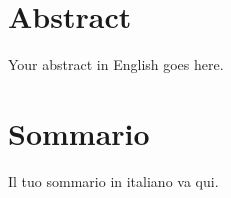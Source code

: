 \section*{Abstract}
Your abstract in English goes here.

\section*{Sommario}
\begin{otherlanguage}{italian}
Il tuo sommario in italiano va qui.
\end{otherlanguage}